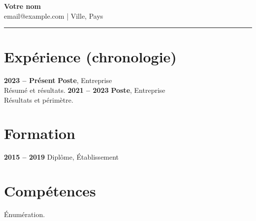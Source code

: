 \documentclass[11pt,a4paper]{article}
\begin{document}
\begin{center}
{\LARGE \textbf{Votre nom}}\\[0.2em]
email@example.com \quad | \quad Ville, Pays
\end{center}
\begin{flushright}\rule{2cm}{2.5cm}\end{flushright}
\vspace{0.6em}
\section*{Expérience (chronologie)}
\textbf{2023 -- Présent} \quad \textbf{Poste}, Entreprise \\
Résumé et résultats.
\vspace{0.3em}
\textbf{2021 -- 2023} \quad \textbf{Poste}, Entreprise \\
Résultats et périmètre.
\vspace{0.5em}
\section*{Formation}
\textbf{2015 -- 2019} \quad Diplôme, Établissement
\section*{Compétences}
Énumération.
\end{document}
